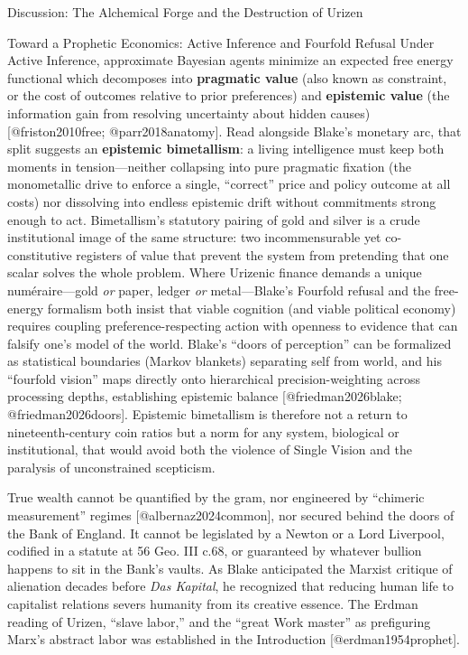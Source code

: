 \documentclass[
  ignorenonframetext,
]{beamer}
\begin{document}
\begin{frame}{Discussion: The Alchemical Forge and the Destruction of
Urizen}
\begin{block}{Toward a Prophetic Economics: Active Inference and
Fourfold Refusal}
\protect{}\label{toward-a-prophetic-economics-active-inference-and-fourfold-refusal}
Under Active Inference, approximate Bayesian agents minimize an expected
free energy functional which decomposes into \textbf{pragmatic value}
(also known as constraint, or the cost of outcomes relative to prior
preferences) and \textbf{epistemic value} (the information gain from
resolving uncertainty about hidden causes) {[}@friston2010free;
@parr2018anatomy{]}. Read alongside Blake's monetary arc, that split
suggests an \textbf{epistemic bimetallism}: a living intelligence must
keep both moments in tension---neither collapsing into pure pragmatic
fixation (the monometallic drive to enforce a single, ``correct'' price
and policy outcome at all costs) nor dissolving into endless epistemic
drift without commitments strong enough to act. Bimetallism's statutory
pairing of gold and silver is a crude institutional image of the same
structure: two incommensurable yet co-constitutive registers of value
that prevent the system from pretending that one scalar solves the whole
problem. Where Urizenic finance demands a unique numéraire---gold
\emph{or} paper, ledger \emph{or} metal---Blake's Fourfold refusal and
the free-energy formalism both insist that viable cognition (and viable
political economy) requires coupling preference-respecting action with
openness to evidence that can falsify one's model of the world. Blake's
``doors of perception'' can be formalized as statistical boundaries
(Markov blankets) separating self from world, and his ``fourfold
vision'' maps directly onto hierarchical precision-weighting across
processing depths, establishing epistemic balance {[}@friedman2026blake;
@friedman2026doors{]}. Epistemic bimetallism is therefore not a return
to nineteenth-century coin ratios but a norm for any system, biological
or institutional, that would avoid both the violence of Single Vision
and the paralysis of unconstrained scepticism.

True wealth cannot be quantified by the gram, nor engineered by
``chimeric measurement'' regimes {[}@albernaz2024common{]}, nor secured
behind the doors of the Bank of England. It cannot be legislated by a
Newton or a Lord Liverpool, codified in a statute at 56 Geo. III c.68,
or guaranteed by whatever bullion happens to sit in the Bank's vaults.
As Blake anticipated the Marxist critique of alienation decades before
\emph{Das Kapital}, he recognized that reducing human life to capitalist
relations severs humanity from its creative essence. The Erdman reading
of Urizen, ``slave labor,'' and the ``great Work master'' as prefiguring
Marx's abstract labor was established in the Introduction
{[}@erdman1954prophet{]}.


\end{block}
\end{frame}
\end{document}
